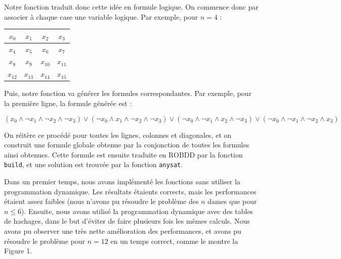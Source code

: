\documentclass[a4paper,11pt]{article}
\begin{document}
	Notre fonction traduit donc cette idée en formule logique. On commence donc par associer à chaque case une variable logique. Par exemple, pour $n = 4$ :
	
	\begin{center}
	\begin{tabular}{|*{4}{c|}}
	
            \hline
            $x_0$ & $x_1$ & $x_2$ & $x_3$ \\
            \hline
            $x_4$ & $x_5$ & $x_6$ & $x_7$ \\
            \hline
            $x_8$ & $x_9$ & $x_{10}$ & $x_{11}$ \\
            \hline
            $x_{12}$ & $x_{13}$ & $x_{14}$ & $x_{15}$ \\
            \hline
        \end{tabular}
        \end{center}
        
        Puis, notre fonction va générer les formules correspondantes. Par exemple, pour la première ligne, la formule générée est :
        
        $$(x_0 \land \neg x_1 \land \neg x_2 \land \neg x_3) \lor (\neg x_0 \land x_1 \land \neg x_2 \land \neg x_3) \lor (\neg x_0 \land \neg x_1 \land x_2 \land \neg x_3) \lor (\neg x_0 \land \neg x_1 \land \neg x_2 \land x_3)$$
        
        On réitère ce procédé pour toutes les lignes, colonnes et diagonales, et on construit une formule globale obtenue par la conjonction de toutes les formules ainsi obtenues. Cette formule est ensuite traduite en ROBDD par la fonction \texttt{build}, et une solution est trouvée par la fonction \texttt{anysat}.
	
	Dans un premier temps, nous avons implémenté les fonctions sans utiliser la programmation dynamique. Les résultats étaients corrects, mais les performances
	étaient assez faibles (nous n'avons pu résoudre le problème des $n$ dames que pour $n \leq 6$).
        Ensuite, nous avons utilisé la programmation dynamique avec des tables de hachages, dans le but d'éviter de faire plusieurs fois les mêmes calculs. Nous avons pu observer une très nette amélioration des performances, et avons pu résoudre le problème pour $n = 12$ en un temps correct, comme le montre la Figure 1.
        
\end{document}
